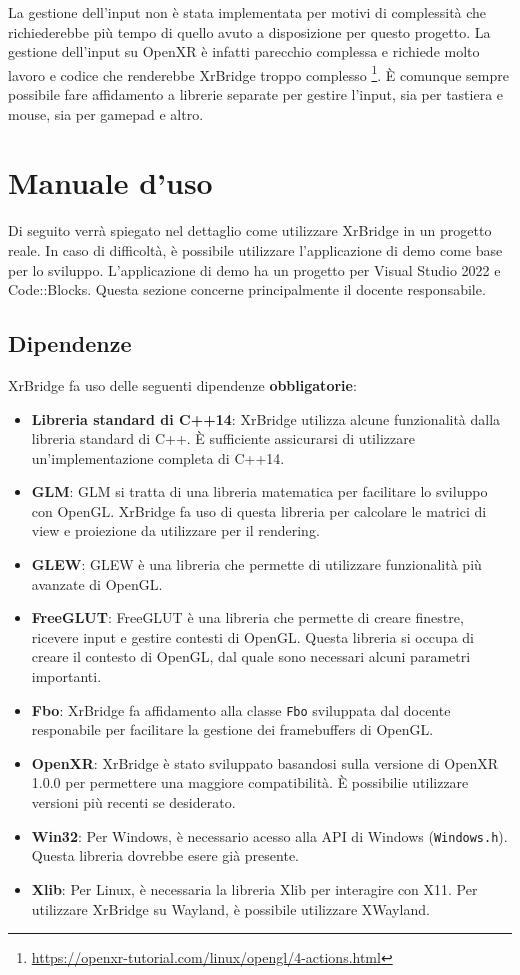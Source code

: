 \documentclass[twoside]{supsistudent}
\begin{document}
La gestione dell'input non è stata implementata per motivi di complessità che richiederebbe più tempo di quello avuto a disposizione per questo progetto. La gestione dell'input su OpenXR è infatti parecchio complessa e richiede molto lavoro e codice che renderebbe XrBridge troppo complesso \footnote{\url{https://openxr-tutorial.com/linux/opengl/4-actions.html}}. È comunque sempre possibile fare affidamento a librerie separate per gestire l'input, sia per tastiera e mouse, sia per gamepad e altro.

\section{Manuale d'uso}

Di seguito verrà spiegato nel dettaglio come utilizzare XrBridge in un progetto reale. In caso di difficoltà, è possibile utilizzare l'applicazione di demo come base per lo sviluppo. L'applicazione di demo ha un progetto per Visual Studio 2022 e Code::Blocks. Questa sezione concerne principalmente il docente responsabile.

\subsection{Dipendenze}

XrBridge fa uso delle seguenti dipendenze \textbf{obbligatorie}:

\begin{itemize}
  \item \textbf{Libreria standard di C++14}: XrBridge utilizza alcune funzionalità dalla libreria standard di C++. È sufficiente assicurarsi di utilizzare un'implementazione completa di C++14.
  \item \textbf{GLM}: GLM si tratta di una libreria matematica per facilitare lo sviluppo con OpenGL. XrBridge fa uso di questa libreria per calcolare le matrici di view e proiezione da utilizzare per il rendering.
  \item \textbf{GLEW}: GLEW è una libreria che permette di utilizzare funzionalità più avanzate di OpenGL.
  \item \textbf{FreeGLUT}: FreeGLUT è una libreria che permette di creare finestre, ricevere input e gestire contesti di OpenGL. Questa libreria si occupa di creare il contesto di OpenGL, dal quale sono necessari alcuni parametri importanti.
  \item \textbf{Fbo}: XrBridge fa affidamento alla classe \texttt{Fbo} sviluppata dal docente responabile per facilitare la gestione dei framebuffers di OpenGL.
  \item \textbf{OpenXR}: XrBridge è stato sviluppato basandosi sulla versione di OpenXR 1.0.0 per permettere una maggiore compatibilità. È possibilie utilizzare versioni più recenti se desiderato.
  \item \textbf{Win32}: Per Windows, è necessario acesso alla API di Windows (\texttt{Windows.h}). Questa libreria dovrebbe esere già presente.
  \item \textbf{Xlib}: Per Linux, è necessaria la libreria Xlib per interagire con X11. Per utilizzare XrBridge su Wayland, è possibile utilizzare XWayland.
\end{itemize}
\end{document}

